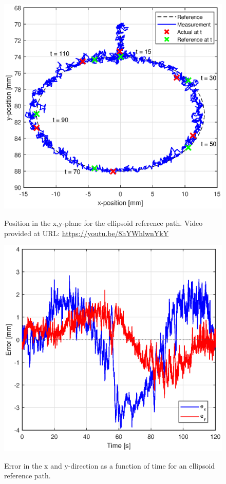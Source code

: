 \begin{figure}[H] 
    \begin{minipage}[b]{0.49\linewidth}
    \centering
    \includegraphics[width = \textwidth]{Figures/Chapter5/xy.eps}
    \caption{Position in the x,y-plane for the ellipsoid reference path. Video provided at URL: \url{https://youtu.be/8hYWhlwnYkY}}
    \label{fig5:xyelips}
       \end{minipage} 
    \begin{minipage}[b]{0.49\linewidth}
    \centering
    \includegraphics[width = \textwidth]{Figures/Chapter5/errorxy.eps}
    \caption{Error in the x and y-direction as a function of time for an ellipsoid reference path.}
    \hspace{10pt}
    \label{fig5:errorelips}
    \end{minipage} 
\end{figure}



